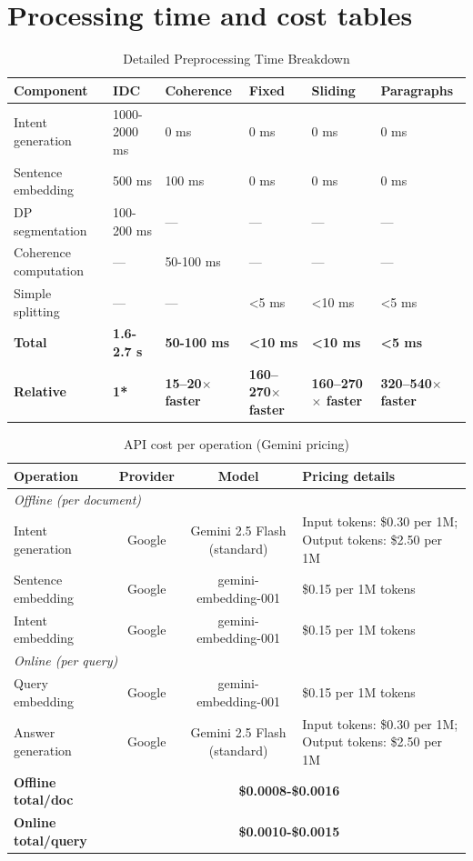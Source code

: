 \documentclass[12pt,a4paper]{report}
\begin{document}
\section{Processing time and cost tables}

\begin{table}[h!]
\centering
\caption{Detailed Preprocessing Time Breakdown}
\label{tab:preprocessing_breakdown}
\scriptsize
\begin{tabularx}{\textwidth}{l*{5}{Y}}
\hline
\textbf{Component} & \textbf{IDC} & \textbf{Coherence} & \textbf{Fixed} & \textbf{Sliding} & \textbf{Paragraphs} \\
\hline
Intent generation & 1000-2000 ms & 0 ms & 0 ms & 0 ms & 0 ms \\
Sentence embedding & 500 ms & 100 ms & 0 ms & 0 ms & 0 ms \\
DP segmentation & 100-200 ms & --- & --- & --- & --- \\
Coherence computation & --- & 50-100 ms & --- & --- & --- \\
Simple splitting & --- & --- & <5 ms & <10 ms & <5 ms \\
\hline
\textbf{Total} & \textbf{1.6-2.7 s} & \textbf{50-100 ms} & \textbf{<10 ms} & \textbf{<10 ms} & \textbf{<5 ms} \\
\textbf{Relative} & \textbf{1*} & \textbf{15--20$\times$ faster} & \textbf{160--270$\times$ faster} & \textbf{160--270$\times$ faster} & \textbf{320--540$\times$ faster} \\
\hline
\end{tabularx}
\end{table}

\begin{table}[h!]
\centering
\caption{API cost per operation (Gemini pricing)}
\label{tab:api_cost_details}
\small
\begin{tabularx}{\textwidth}{lccX}
\hline
\textbf{Operation} & \textbf{Provider} & \textbf{Model} & \textbf{Pricing details} \\
\hline
\multicolumn{4}{l}{\textit{Offline (per document)}} \\
Intent generation & Google & Gemini 2.5 Flash (standard) & Input tokens: \$0.30 per 1M; Output tokens: \$2.50 per 1M \\
Sentence embedding & Google & gemini-embedding-001 & \$0.15 per 1M tokens \\
Intent embedding & Google & gemini-embedding-001 & \$0.15 per 1M tokens \\
\hline
\multicolumn{4}{l}{\textit{Online (per query)}} \\
Query embedding & Google & gemini-embedding-001 & \$0.15 per 1M tokens \\
Answer generation & Google & Gemini 2.5 Flash (standard) & Input tokens: \$0.30 per 1M; Output tokens: \$2.50 per 1M \\
\hline
\textbf{Offline total/doc} & \multicolumn{3}{c}{\textbf{\$0.0008-\$0.0016}} \\
\textbf{Online total/query} & \multicolumn{3}{c}{\textbf{\$0.0010-\$0.0015}} \\
\hline
\end{tabularx}
\end{table}
\end{document}
